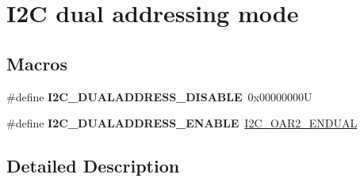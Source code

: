 \hypertarget{group___i2_c__dual__addressing__mode}{}\section{I2C dual addressing mode}
\label{group___i2_c__dual__addressing__mode}
\subsection*{Macros}
\begin{DoxyCompactItemize}
\item 
\mbox{\label{group___i2_c__dual__addressing__mode_gacb8f4a1fd543e5ef2c9e7711fc9b5a67}} 
\#define {\bfseries I2\+C\+\_\+\+D\+U\+A\+L\+A\+D\+D\+R\+E\+S\+S\+\_\+\+D\+I\+S\+A\+B\+LE}~0x00000000U
\item 
\mbox{\label{group___i2_c__dual__addressing__mode_gae33ff5305d9f38d857cff1774f481fab}} 
\#define {\bfseries I2\+C\+\_\+\+D\+U\+A\+L\+A\+D\+D\+R\+E\+S\+S\+\_\+\+E\+N\+A\+B\+LE}~\hyperlink{group___peripheral___registers___bits___definition_gab83ed1ee64439cb2734a708445f37e94}{I2\+C\+\_\+\+O\+A\+R2\+\_\+\+E\+N\+D\+U\+AL}
\end{DoxyCompactItemize}


\subsection{Detailed Description}
